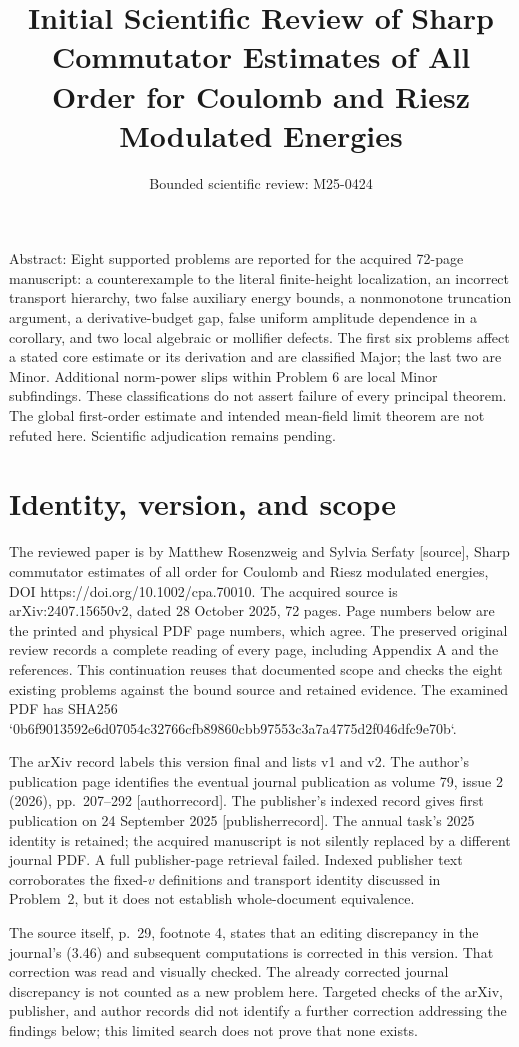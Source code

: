 \documentclass[10pt]{article}
\title{Initial Scientific Review of
Sharp Commutator Estimates of All Order
for Coulomb and Riesz Modulated Energies}
\author{Bounded scientific review: M25-0424}
\date{}
\begin{document}
\maketitle
Abstract: Eight supported problems are reported for the acquired 72-page manuscript: a counterexample to the literal finite-height localization, an incorrect transport hierarchy, two false auxiliary energy bounds, a nonmonotone truncation argument, a derivative-budget gap, false uniform amplitude dependence in a corollary, and two local algebraic or mollifier defects. The first six problems affect a stated core estimate or its derivation and are classified Major; the last two are Minor. Additional norm-power slips within Problem 6 are local Minor subfindings. These classifications do not assert failure of every principal theorem. The global first-order estimate and intended mean-field limit theorem are not refuted here. Scientific adjudication remains pending.\par
\section*{Identity, version, and scope}
The reviewed paper is by Matthew Rosenzweig and Sylvia Serfaty [source], Sharp commutator estimates of all order for Coulomb and Riesz modulated energies, DOI https://doi.org/10.1002/cpa.70010. The acquired source is arXiv:2407.15650v2, dated 28 October 2025, 72 pages. Page numbers below are the printed and physical PDF page numbers, which agree. The preserved original review records a complete reading of every page, including Appendix A and the references. This continuation reuses that documented scope and checks the eight existing problems against the bound source and retained evidence. The examined PDF has SHA256 `0b6f9013592e6d07054c32766cfb89860cbb97553c3a7a4775d2f046dfc9e70b`.\par
The arXiv record labels this version final and lists v1 and v2. The author’s publication page identifies the eventual journal publication as volume 79, issue 2 (2026), pp. 207–292 [authorrecord]. The publisher’s indexed record gives first publication on 24 September 2025 [publisherrecord]. The annual task’s 2025 identity is retained; the acquired manuscript is not silently replaced by a different journal PDF. A full publisher-page retrieval failed. Indexed publisher text corroborates the fixed-\(v\) definitions and transport identity discussed in Problem 2, but it does not establish whole-document equivalence.\par
The source itself, p. 29, footnote 4, states that an editing discrepancy in the journal’s (3.46) and subsequent computations is corrected in this version. That correction was read and visually checked. The already corrected journal discrepancy is not counted as a new problem here. Targeted checks of the arXiv, publisher, and author records did not identify a further correction addressing the findings below; this limited search does not prove that none exists.\par
\end{document}
